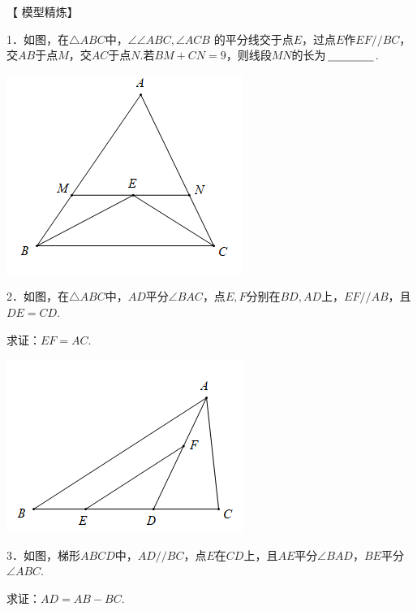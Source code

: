 \documentclass[10pt]{ctexart}
\begin{document}
【 {\heiti 模型精炼}】

\begin{shaded}
1．如图，在$\triangle ABC$中，$∠\angle ABC,\angle ACB$ 的平分线交于点$E$，过点$E$作$EF//BC$，交$AB$于点$M$，交$AC$于点$N$.若$BM+CN=9$，则线段$MN$的长为$\underline{\hspace{1.5cm}}$.
\end{shaded}

\begin{flushright}
	\includegraphics[scale=0.6]{figure/jiaopfxian19}
\end{flushright}

\begin{shaded}
2．如图，在$\triangle ABC$中，$AD$平分$\angle BAC$，点$E,F$分别在$BD,AD$上，$EF//AB$，且$DE=CD$.

求证：$EF=AC$.
\end{shaded}

\begin{flushright}
	\includegraphics[scale=0.6]{figure/jiaopfxian20}
\end{flushright}

\begin{shaded}
3．如图，梯形$ABCD$中，$AD//BC$，点$E$在$CD$上，且$AE$平分$\angle BAD$，$BE$平分$\angle ABC$.

求证：$AD=AB-BC$.
\end{shaded}
\end{document}
